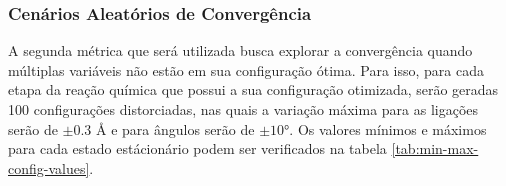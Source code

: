\subsubsection{Cenários Aleatórios de Convergência}

A segunda métrica que será utilizada busca explorar a convergência quando múltiplas variáveis não estão em sua configuração ótima. Para isso, para cada etapa da reação química que possui a sua configuração otimizada, serão geradas 100 configurações distorciadas, nas quais a variação máxima para as ligações serão de $\pm 0.3$ \AA{} e para ângulos serão de $\pm \ang{10}$. Os valores mínimos e máximos para cada estado estácionário podem ser verificados na tabela \ref{tab:min-max-config-values}.

\begin{table}[h]
\centering
  \caption{Valores mínimos e máximos que podem ser gerados nos cenários aleatórios de convergência para cada ponto estacionário da reação }
  \label{tab:min-max-config-values}
\end{table}
